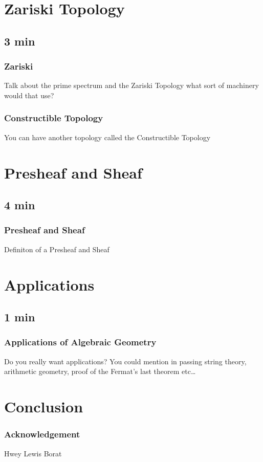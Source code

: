 \documentclass[pdf]{beamer}
\begin{document}
\section{Zariski Topology}
\subsection{3 min}

\begin{frame}
    \frametitle{Zariski}
    Talk about the prime spectrum and the Zariski Topology what sort of machinery would that use? 
\end{frame}

\begin{frame}
    \frametitle{Constructible Topology}
    You can have another topology called the Constructible Topology
\end{frame}

\section{Presheaf and Sheaf}
\subsection{4 min}

\begin{frame}
    \frametitle{Presheaf and Sheaf}
     Definiton of a Presheaf and Sheaf 
 \end{frame}

 \section{Applications}
 \subsection{1 min}

 \begin{frame}
     \frametitle{Applications of Algebraic Geometry}
    Do you really want applications? You could mention in passing string theory, arithmetic geometry, proof of the Fermat’s last theorem etc… 
\end{frame}

\section{Conclusion}

\begin{frame}
    \frametitle{Acknowledgement}
    Hwey Lewis
    Borat
\end{frame}
     
\end{document}
